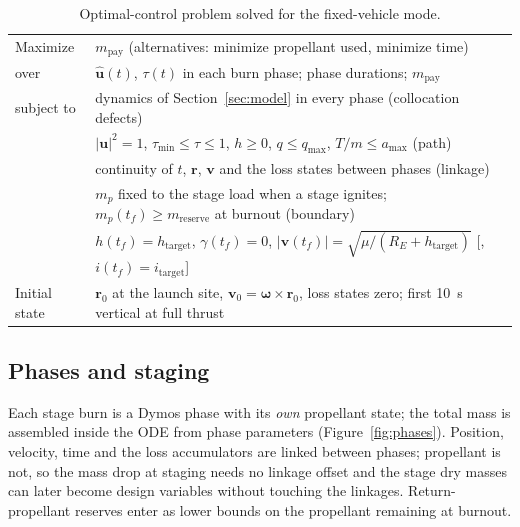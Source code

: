 \documentclass[11pt,a4paper]{article}
\begin{document}
\begin{table}[h]\centering\small
\caption{Optimal-control problem solved for the fixed-vehicle mode.}
\label{tab:formulation}
\begin{tabular}{lp{11.5cm}}
\toprule
Maximize & $m_{\mathrm{pay}}$ (alternatives: minimize propellant used, minimize time) \\
over & $\hat{\bm u}(t)$, $\tau(t)$ in each burn phase; phase durations; $m_{\mathrm{pay}}$ \\
subject to & dynamics of Section~\ref{sec:model} in every phase (collocation defects) \\
 & $|\bm u|^2 = 1$, \; $\tau_{\min}\le\tau\le1$, \; $h\ge0$, \; $q\le q_{\max}$, \; $T/m\le a_{\max}$ (path) \\
 & continuity of $t$, $\bm r$, $\bm v$ and the loss states between phases (linkage) \\
 & $m_p$ fixed to the stage load when a stage ignites; $m_p(t_f) \ge m_{\mathrm{reserve}}$ at burnout (boundary) \\
 & $h(t_f) = h_{\mathrm{target}}$, \; $\gamma(t_f) = 0$, \; $|\bm v(t_f)| = \sqrt{\mu/(R_E+h_{\mathrm{target}})}$ [, $i(t_f) = i_{\mathrm{target}}$] \\
Initial state & $\bm r_0$ at the launch site, $\bm v_0 = \bm\omega\times\bm r_0$, loss states zero; first 10~s vertical at full thrust \\
\bottomrule
\end{tabular}
\end{table}

\subsection{Phases and staging}
Each stage burn is a Dymos phase with its \emph{own} propellant state; the total mass is assembled inside the
ODE from phase parameters (Figure~\ref{fig:phases}). Position, velocity, time and the loss accumulators are linked
between phases; propellant is not, so the mass drop at staging needs no linkage offset and the stage dry masses
can later become design variables without touching the linkages. Return-propellant reserves enter as lower
bounds on the propellant remaining at burnout.
\end{document}
